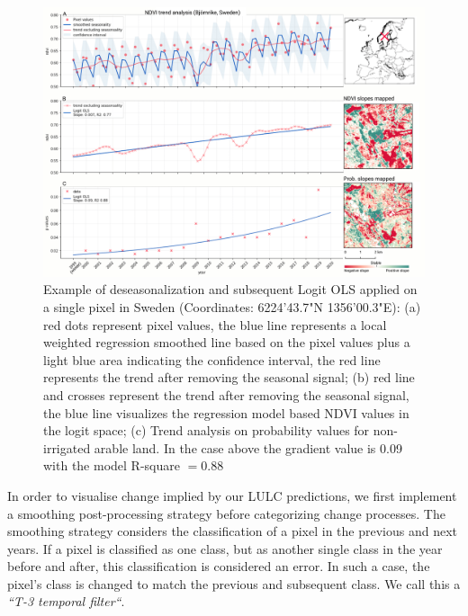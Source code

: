     \begin{figure}
    \centering
    \includegraphics[width=\textwidth]{figs_03/methods_NDVI_p_slope_superplot.png}
    \caption{Example of deseasonalization \citep{seabold2010statsmodels} and subsequent Logit OLS applied on a single pixel in Sweden (Coordinates: 62{\textdegree}24'43.7"N 13{\textdegree}56'00.3"E): (a) red dots represent pixel values, the blue line represents a local weighted regression smoothed line based on the pixel values plus a light blue area indicating the confidence interval, the red line represents the trend after removing the seasonal signal; (b) red line and crosses represent the trend after removing the seasonal signal, the blue line visualizes the regression model based NDVI values in the logit space; (c) Trend analysis on probability values for non-irrigated arable land. In the case above the gradient value is 0.09 with the model R-square $=0.88$} 
    \label{fig:ndvi_timeseries}
    \end{figure}

    In order to visualise change implied by our LULC predictions, we first implement a smoothing post-processing strategy before categorizing change processes. The smoothing strategy considers the classification of a pixel in the previous and next years. If a pixel is classified as one class, but as another single class in the year before and after, this classification is considered an error. In such a case, the pixel's class is changed to match the previous and subsequent class. We call this a \emph{``T-3 temporal filter``}.
        
